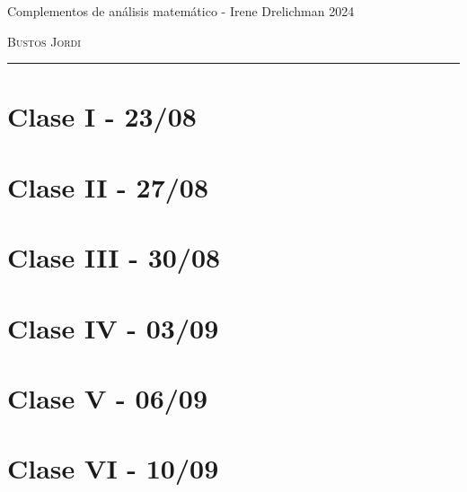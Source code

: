 \documentclass[12pt,a4paper]{book}
\begin{document}
\renewcommand{\contentsname}{\vspace{0cm} Contenido \vspace{-2cm}}

\begin{titlepage}
\vspace*{2cm}

\noindent
\vspace*{0.5cm}

\vspace{1.5cm}
\epigraph{Complementos de análisis matemático - Irene Drelichman 2024}%
{ \textsc{Bustos Jordi}}
\null\vfill
\vspace*{1cm}
\noindent
\hfill
\begin{minipage}{0.7\linewidth}
    \begin{flushright}
        \printauthor
    \end{flushright}
\end{minipage}
%
\begin{minipage}{0.02\linewidth}
    \rule{1pt}{70pt}
\end{minipage}
\titlepagedecoration
\end{titlepage}

\let\cleardoublepage=\clearpage
\tableofcontents
\blankpage

\chapter{Clase I - 23/08 }

\newpage\thispagestyle{empty}\blankpage
\chapter{Clase II - 27/08}

\newpage\thispagestyle{empty}\blankpage
\chapter{Clase III - 30/08}

\newpage\thispagestyle{empty}\blankpage
\chapter{Clase IV - 03/09}

\newpage\thispagestyle{empty}\blankpage
\chapter{Clase V - 06/09}

\newpage\thispagestyle{empty}\blankpage
\chapter{Clase VI - 10/09}

\newpage\thispagestyle{empty}\blankpage
\end{document}
